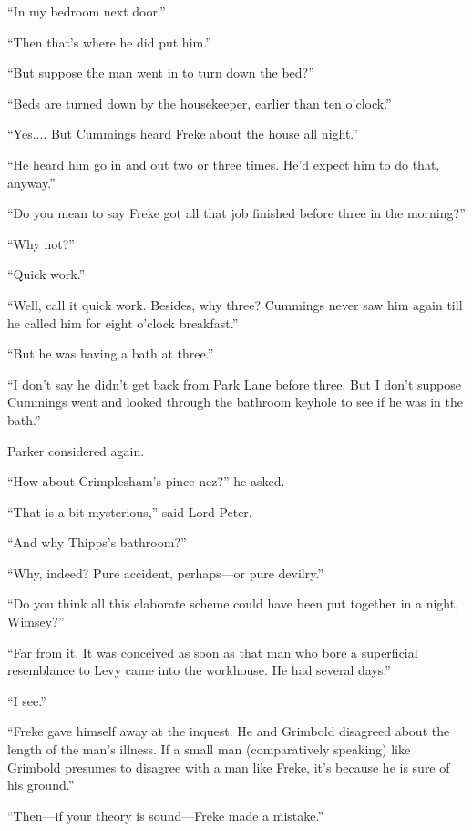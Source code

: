 \enquote{In my bedroom next door.}

\enquote{Then that’s where he did put him.}

\enquote{But suppose the man went in to turn down the bed?}

\enquote{Beds are turned down by the housekeeper, earlier than ten o’clock.}

\enquote{Yes.... But Cummings heard Freke about the house all night.}

\enquote{He heard him go in and out two or three times. He’d expect him to do that, anyway.}

\enquote{Do you mean to say Freke got all that job finished before three in the morning?}

\enquote{Why not?}

\enquote{Quick work.}

\enquote{Well, call it quick work. Besides, why three? Cummings never saw him again till he called him for eight o’clock breakfast.}

\enquote{But he was having a bath at three.}

\enquote{I don’t say he didn’t get back from Park Lane before three. But I don’t suppose Cummings went and looked through the bathroom keyhole to see if he was in the bath.}

Parker considered again.

\enquote{How about Crimplesham’s pince-nez?} he asked.

\enquote{That is a bit mysterious,} said Lord Peter.

\enquote{And why Thipps’s bathroom?}

\enquote{Why, indeed? Pure accident, perhaps\allowbreak---\allowbreak or pure devilry.}

\enquote{Do you think all this elaborate scheme could have been put together in a night, Wimsey?}

\enquote{Far from it. It was conceived as soon as that man who bore a superficial resemblance to Levy came into the workhouse. He had several days.}

\enquote{I see.}

\enquote{Freke gave himself away at the inquest. He and Grimbold disagreed about the length of the man’s illness. If a small man (comparatively speaking) like Grimbold presumes to disagree with a man like Freke, it’s because he is sure of his ground.}

\enquote{Then\allowbreak---\allowbreak if your theory is sound\allowbreak---\allowbreak Freke made a mistake.}


